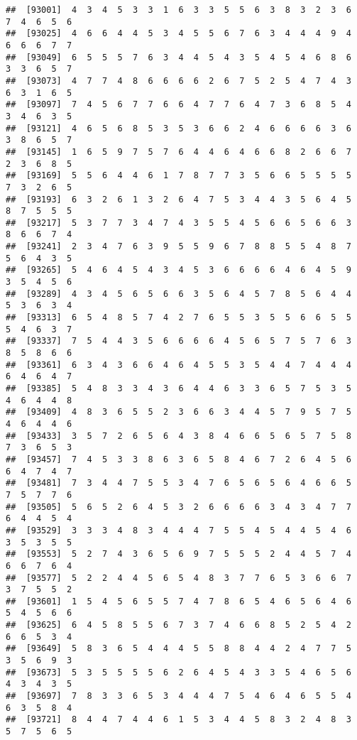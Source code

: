 \documentclass[
]{book}
\begin{document}
\begin{verbatim}
##  [93001]  4  3  4  5  3  3  1  6  3  3  5  5  6  3  8  3  2  3  6  7  4  6  5  6
##  [93025]  4  6  6  4  4  5  3  4  5  5  6  7  6  3  4  4  4  9  4  6  6  6  7  7
##  [93049]  6  5  5  5  7  6  3  4  4  5  4  3  5  4  5  4  6  8  6  3  3  6  5  7
##  [93073]  4  7  7  4  8  6  6  6  6  2  6  7  5  2  5  4  7  4  3  6  3  1  6  5
##  [93097]  7  4  5  6  7  7  6  6  4  7  7  6  4  7  3  6  8  5  4  3  4  6  3  5
##  [93121]  4  6  5  6  8  5  3  5  3  6  6  2  4  6  6  6  6  3  6  3  8  6  5  7
##  [93145]  1  6  5  9  7  5  7  6  4  4  6  4  6  6  8  2  6  6  7  2  3  6  8  5
##  [93169]  5  5  6  4  4  6  1  7  8  7  7  3  5  6  6  5  5  5  5  7  3  2  6  5
##  [93193]  6  3  2  6  1  3  2  6  4  7  5  3  4  4  3  5  6  4  5  8  7  5  5  5
##  [93217]  5  3  7  7  3  4  7  4  3  5  5  4  5  6  6  5  6  6  3  8  6  6  7  4
##  [93241]  2  3  4  7  6  3  9  5  5  9  6  7  8  8  5  5  4  8  7  5  6  4  3  5
##  [93265]  5  4  6  4  5  4  3  4  5  3  6  6  6  6  4  6  4  5  9  3  5  4  5  6
##  [93289]  4  3  4  5  6  5  6  6  3  5  6  4  5  7  8  5  6  4  4  5  3  6  3  4
##  [93313]  6  5  4  8  5  7  4  2  7  6  5  5  3  5  5  6  6  5  5  5  4  6  3  7
##  [93337]  7  5  4  4  3  5  6  6  6  6  4  5  6  5  7  5  7  6  3  8  5  8  6  6
##  [93361]  6  3  4  3  6  6  4  6  4  5  5  3  5  4  4  7  4  4  4  6  4  6  4  7
##  [93385]  5  4  8  3  3  4  3  6  4  4  6  3  3  6  5  7  5  3  5  4  6  4  4  8
##  [93409]  4  8  3  6  5  5  2  3  6  6  3  4  4  5  7  9  5  7  5  4  6  4  4  6
##  [93433]  3  5  7  2  6  5  6  4  3  8  4  6  6  5  6  5  7  5  8  7  3  6  5  3
##  [93457]  7  4  5  3  3  8  6  3  6  5  8  4  6  7  2  6  4  5  6  6  4  7  4  7
##  [93481]  7  3  4  4  7  5  5  3  4  7  6  5  6  5  6  4  6  6  5  7  5  7  7  6
##  [93505]  5  6  5  2  6  4  5  3  2  6  6  6  6  3  4  3  4  7  7  6  4  4  5  4
##  [93529]  3  3  3  4  8  3  4  4  4  7  5  5  4  5  4  4  5  4  6  3  5  3  5  5
##  [93553]  5  2  7  4  3  6  5  6  9  7  5  5  5  2  4  4  5  7  4  6  6  7  6  4
##  [93577]  5  2  2  4  4  5  6  5  4  8  3  7  7  6  5  3  6  6  7  3  7  5  5  2
##  [93601]  1  5  4  5  6  5  5  7  4  7  8  6  5  4  6  5  6  4  6  5  4  5  6  6
##  [93625]  6  4  5  8  5  5  6  7  3  7  4  6  6  8  5  2  5  4  2  6  6  5  3  4
##  [93649]  5  8  3  6  5  4  4  4  5  5  8  8  4  4  2  4  7  7  5  3  5  6  9  3
##  [93673]  5  3  5  5  5  5  6  2  6  4  5  4  3  3  5  4  6  5  6  4  3  4  3  5
##  [93697]  7  8  3  3  6  5  3  4  4  4  7  5  4  6  4  6  5  5  4  6  3  5  8  4
##  [93721]  8  4  4  7  4  4  6  1  5  3  4  4  5  8  3  2  4  8  3  5  7  5  6  5

\end{verbatim}
\end{document}
